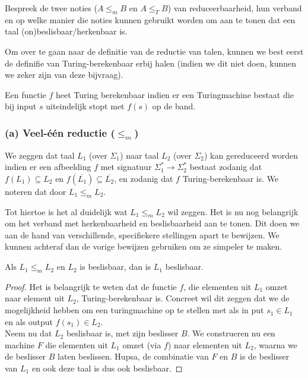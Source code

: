 \begin{question}
	Bespreek de twee noties ($A \leq_m B$ en $A \leq_T B$) van reduceerbaarheid, hun verband en op welke manier die noties kunnen gebruikt worden om aan te tonen dat een taal (on)beslisbaar/herkenbaar is.
\end{question}

Om over te gaan naar de definitie van de reductie van talen, kunnen we best eerst de definifie van Turing-berekenbaar erbij halen (indien we dit niet doen, kunnen we zeker zijn van deze bijvraag).

\begin{theorem}
	Een functie $f$ heet Turing berekenbaar indien er een Turingmachine bestaat die bij input $s$ uiteindelijk stopt met $f(s)$ op de band.
\end{theorem}

\subsubsection*{(a) Veel-\'e\'en reductie ($\leq_m$)}

\begin{theorem}
	We zeggen dat taal $L_1$ (over $\Sigma_1$) naar taal $L_2$ (over $\Sigma_2$) kan gereduceerd worden indien er een afbeelding $f$ met signatuur $\Sigma^*_1\longrightarrow \Sigma^*_2$ bestaat zodanig dat $f(L_1) \subseteq L_2$ en $f(\overline{L_1}) \subseteq \overline{L_2}$, en zodanig dat $f$ Turing-berekenbaar is. We noteren dat door $L_1 \leq_m L_2$.
\end{theorem}

Tot hiertoe is het al duidelijk wat $L_1 \leq_m L_2$ wil zeggen. Het is nu nog belangrijk om het verband met herkenbaarheid en beslisbaarheid aan te tonen. Dit doen we aan de hand van verschillende, specifiekere stellingen apart te bewijzen. We kunnen achteraf dan de vorige bewijzen gebruiken om ze simpeler te maken.

\begin{theorem}
	Als $L_1 \leq_m L_2$ en $L_2$ is beslisbaar, dan is $L_1$ beslisbaar.
\end{theorem}

\begin{proof}
	Het is belangrijk te weten dat de functie $f$, die elementen uit $L_1$ omzet naar element uit $L_2$, Turing-berekenbaar is. Concreet wil dit zeggen dat we de mogelijkheid hebben om een turingmachine op te stellen met als in put $s_1 \in L_1$ en als output $f(s_1) \in L_2$.\\
	Neem nu dat $L_2$ beslisbaar is, met zijn beslisser $B$. We construeren  nu een machine $F$ die elementen uit $L_1$ omzet (via $f$) naar elementen uit $L_2$, waarna we de beslisser $B$ laten beslissen. Hupsa, de combinatie van $F$ en $B$ is de beslisser van $L_1$ en ook deze taal is dus ook beslisbaar.
\end{proof}

